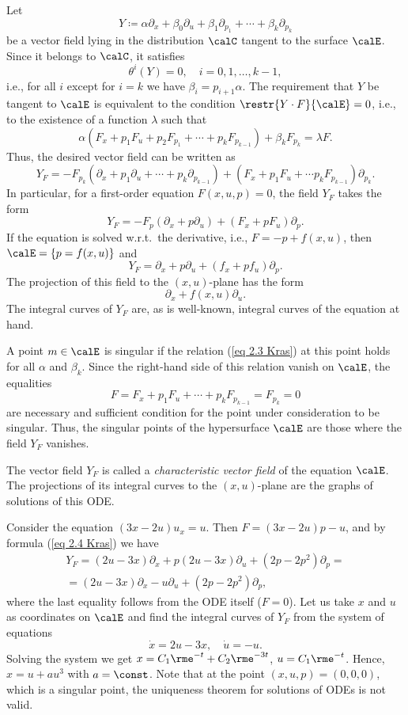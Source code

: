Let 
\[Y\coloneqq \alpha\partial_x+\beta_0\partial_u+\beta_1\partial_{p_1}+\cdots+\beta_k\partial_{p_k}\]
be a vector field lying in the distribution $\calC$ tangent to the surface $\calE$. Since it belongs to $\calC$, it satisfies 
\[\theta^i(Y)=0,\quad i=0,1,\ldots,k-1,\]
i.e., for all $i$ except for $i=k$ we have $\beta_i=p_{i+1}\alpha$. The requirement that $Y$ be tangent to $\calE$ is equivalent to the condition $\restr{Y\cdot F}{\calE}=0$, i.e., to the existence of a function $\lambda$ such that 
\[\alpha\left(F_x+p_1F_u+p_2F_{p_1}+\cdots+p_k F_{p_{k-1}}\right)+\beta_kF_{p_k}=\lambda F.\label{eq 2.3 Kras}\]
Thus, the desired vector field can be written as 
\[
    Y_F=-F_{p_k}\left(\partial_x+p_1\partial_u+\cdots+p_k\partial_{p_{k-1}}\right)
    +\left(F_x+p_1F_u+\cdots p_kF_{p_{k-1}}\right)\partial_{p_k}.
\]
In particular, for a first-order equation $F(x,u,p)=0$, the field $Y_F$ takes the form 
\[Y_F=-F_p\left(\partial_x+p\partial_u\right)+\left(F_x+pF_u\right)\partial_p.\label{eq 2.4 Kras}\]
If the equation is solved w.r.t.\ the derivative, i.e., $F=-p+f(x,u)$, then $\calE=\{p=f(x,u)\}$ and  
\[Y_F=\partial_x+p\partial_u+\left(f_x+pf_u\right)\partial_p.\]
The projection of this field to the $(x,u)$-plane has the form 
\[\partial_x+f(x,u)\partial_u.\]
The integral curves of $Y_F$ are, as is well-known, integral curves of the equation at hand. 

A point $m\in \calE$ is singular if the relation (\ref{eq 2.3 Kras}) at this point holds for all $\alpha$ and $\beta_k$. Since the right-hand side of this relation vanish on $\calE$, the equalities 
\[F=F_x+p_1F_u+\cdots+p_kF_{p_{k-1}}=F_{p_k}=0\]
are necessary and sufficient condition for the point under consideration to be singular. Thus, the singular points of the hypersurface $\calE$ are those where the field $Y_F $ vanishes. 

The vector field $Y_F$ is called a \emph{characteristic vector field} of the equation $\calE$. The projections of its integral curves to the $(x,u)$-plane are the graphs of solutions of this ODE.


\begin{example}\label{ex 2.2 Kras}
    Consider the equation $(3x-2u)u_x=u$. Then $F=(3x-2u)p-u$, and by formula (\ref{eq 2.4 Kras}) we have 
    \begin{multline}
        Y_F=(2u-3x)\partial_x+p(2u-3x)\partial_u+(2p-2p^2)\partial_p=\\
        =(2u-3x)\partial_x-u\partial_u+(2p-2p^2)\partial_p,
    \end{multline}
    where the last equality follows from the ODE itself ($F=0$). Let us take $x$ and $u$ as coordinates on $\calE$ and find the integral curves of $Y_F$ from the system of equations 
    \[\dot x=2u-3x,\quad \dot u=-u.\]
    Solving the system we get $x=C_1\rme^{-t}+C_2\rme^{-3t}$, $u=C_1\rme^{-t}$. Hence, $x=u+au^3$ with $a=\const$. Note that at the point $(x,u,p)=(0,0,0)$, which is a singular point, the uniqueness theorem for solutions of ODEs is not valid.
\end{example}







